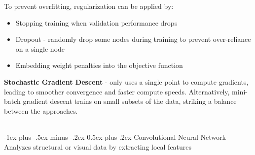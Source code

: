 \documentclass[10pt,landscape]{article}
\makeatletter
\renewcommand{\section}{\@startsection{section}{1}{0mm}%
                                {-1ex plus -.5ex minus -.2ex}%
                                {0.5ex plus .2ex}%
                                {\normalfont\large\bfseries}}
\makeatother
\begin{document}
\begin{multicols}{3}
To prevent overfitting, regularization can be applied by: 
\begin{itemize}[label={--},leftmargin=4mm]
\itemsep -.4mm 
\item Stopping training when validation performance drops
\item Dropout - randomly drop some nodes during training to prevent over-reliance on a single node
\item Embedding weight penalties into the objective function
\end{itemize}
\textbf{Stochastic Gradient Descent} - only uses a single point to compute gradients, leading to smoother convergence and faster compute speeds. Alternatively, mini-batch gradient descent trains on small subsets of the data, striking a balance between the approaches.

\columnbreak
\textcolor{white}{.}\vspace{-5mm}\\ %
\section{Convolutional Neural Network}
Analyzes structural or visual data by extracting local features 


\end{multicols}
\end{document}
